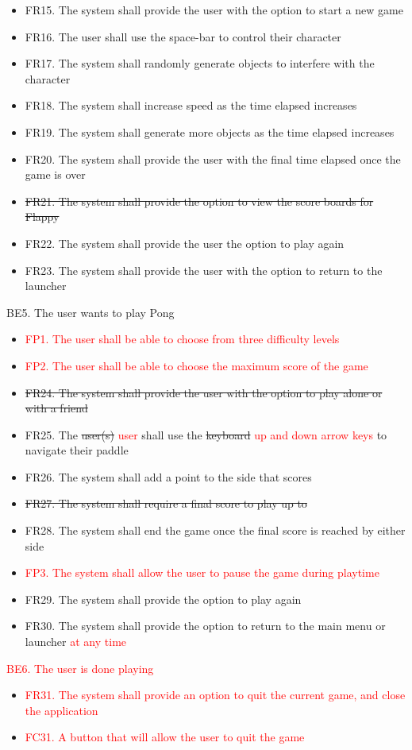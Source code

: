\documentclass[12pt, titlepage]{article}
\begin{document}
    \begin{itemize}
        \item FR15. The system shall provide the user with the option to start a new game
        \item FR16. The user shall use the space-bar to control their character
        \item FR17. The system shall randomly generate objects to interfere with the character
        \item FR18. The system shall increase speed as the time elapsed increases
        \item FR19. The system shall generate more objects as the time elapsed increases
        \item FR20. The system shall provide the user with the final time elapsed once the game is over
        \item \sout{FR21. The system shall provide the option to view the score boards for Flappy}
        \item FR22. The system shall provide the user the option to play again
        \item FR23. The system shall provide the user with the option to return to the launcher
    \end{itemize}
    BE5. The user wants to play Pong
    \begin{itemize}
        \item \textcolor{red}{FP1. The user shall be able to choose from three difficulty levels}
        \item \textcolor{red}{FP2. The user shall be able to choose the maximum score of the game}
        \item \sout{FR24. The system shall provide the user with the option to play alone or with a friend}
        \item FR25. The \sout{user(s)} \textcolor{red}{user} shall use the \sout{keyboard} \textcolor{red}{up and down arrow keys} to navigate their paddle
        \item FR26. The system shall add a point to the side that scores
        \item \sout{FR27. The system shall require a final score to play up to}
        \item FR28. The system shall end the game once the final score is reached by either side
        \item \textcolor{red}{FP3. The system shall allow the user to pause the game during playtime}
        \item FR29. The system shall provide the option to play again
        \item FR30. The system shall provide the option to return to the main menu or launcher \textcolor{red}{at any time}
    \end{itemize}
    \textcolor{red}{BE6. The user is done playing}
    \begin{itemize}
        \item \textcolor{red}{FR31. The system shall provide an option to quit the current game, and close the application}
        \item \textcolor{red}{FC31. A button that will allow the user to quit the game}
    \end{itemize}
\end{document}
